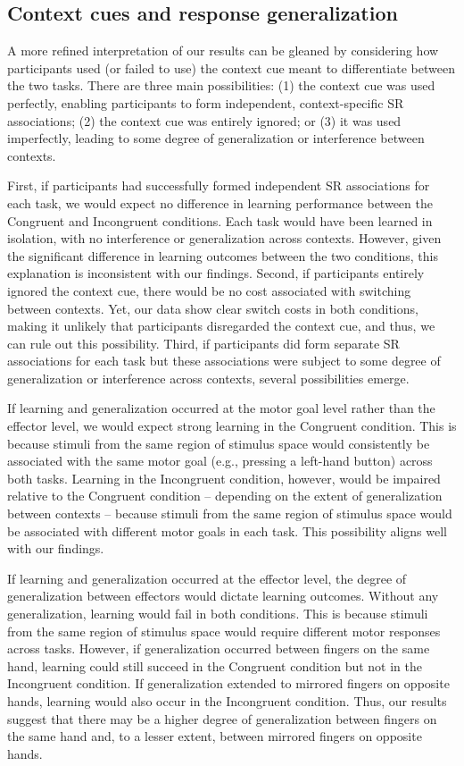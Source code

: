 \documentclass[doc, floatsintext]{apa7}
\begin{document}
\subsection{Context cues and response generalization}
A more refined interpretation of our results can be gleaned
by considering  how participants used (or failed to use) the
context cue meant to differentiate between the two tasks.
There are three main possibilities: (1) the context cue was
used perfectly, enabling participants to form independent,
context-specific SR associations; (2) the context cue was
entirely ignored; or (3) it was used imperfectly, leading to
some degree of generalization or interference between
contexts. 

First, if participants had successfully formed independent
SR associations for each task, we would expect no difference
in learning performance between the Congruent and
Incongruent conditions. Each task would have been learned in
isolation, with no interference or generalization across
contexts. However, given the significant difference in
learning outcomes between the two conditions, this
explanation is inconsistent with our findings. Second, if
participants entirely ignored the context cue, there would
be no cost associated with switching between contexts. Yet,
our data show clear switch costs in both conditions, making
it unlikely that participants disregarded the context cue,
and thus, we can rule out this possibility. Third, if
participants did form separate SR associations for each task
but these associations were subject to some degree of
generalization or interference across contexts, several
possibilities emerge.

If learning and generalization occurred at the motor goal
level rather than the effector level, we would expect strong
learning in the Congruent condition. This is because stimuli
from the same region of stimulus space would consistently be
associated with the same motor goal (e.g., pressing a
left-hand button) across both tasks. Learning in the
Incongruent condition, however, would be impaired relative
to the Congruent condition -- depending on the extent of
generalization between contexts -- because stimuli from the
same region of stimulus space would be associated with
different motor goals in each task. This possibility aligns
well with our findings.

If learning and generalization occurred at the effector
level, the degree of generalization between effectors would
dictate learning outcomes. Without any generalization,
learning would fail in both conditions. This is because
stimuli from the same region of stimulus space would require
different motor responses across tasks.  However, if
generalization occurred between fingers on the same hand,
learning could still succeed in the Congruent condition but
not in the Incongruent condition. If generalization extended
to mirrored fingers on opposite hands, learning would also
occur in the Incongruent condition. Thus, our results
suggest that there may be a higher degree of generalization
between fingers on the same hand and, to a lesser extent,
between mirrored fingers on opposite hands.
\end{document}
